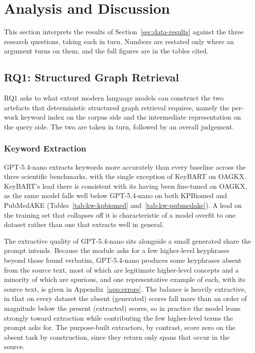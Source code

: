\section{Analysis and Discussion}
\label{sec:analysis-discussion}

This section interprets the results of Section~\ref{sec:data-results} against the three research questions, taking each in turn. Numbers are restated only where an argument turns on them, and the full figures are in the tables cited.

\subsection{RQ1: Structured Graph Retrieval}
\label{subsec:rq1}

RQ1 asks to what extent modern language models can construct the two artefacts that deterministic structured graph retrieval requires, namely the per-work keyword index on the corpus side and the intermediate representation on the query side. The two are taken in turn, followed by an overall judgement.

\subsubsection{Keyword Extraction}

GPT-5.4-nano extracts keywords more accurately than every baseline across the three scientific benchmarks, with the single exception of KeyBART on OAGKX. KeyBART's lead there is consistent with its having been fine-tuned on OAGKX, %
as the same model falls well below GPT-5.4-nano on both KPBiomed and PubMedAKE (Tables~\ref{tab:kw-kpbiomed} and~\ref{tab:kw-pubmedake}). A lead on the training set that collapses off it is characteristic of a model overfit to one dataset rather than one that extracts well in general.

The extractive quality of GPT-5.4-nano sits alongside a small generated share the prompt intends. Because the module asks for a few higher-level keyphrases beyond those found verbatim, GPT-5.4-nano produces some keyphrases absent from the source text, most of which are legitimate higher-level concepts and a minority of which are spurious, and one representative example of each, with its source text, is given in Appendix~\ref{app:errors}.
The balance is heavily extractive, in that on every dataset the absent (generated) scores fall more than an order of magnitude below the present (extracted) scores, so in practice the model leans strongly toward extraction while contributing the few higher-level terms the prompt asks for. The purpose-built extractors, by contrast, score zero on the absent task by construction, since they return only spans that occur in the source.

